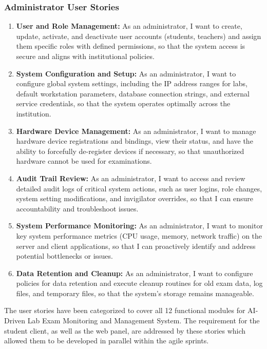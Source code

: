 \subsubsection{Administrator User Stories}
\begin{enumerate}
    \item \textbf{User and Role Management:} As an administrator, I want to create, update, activate, and deactivate user accounts (students, teachers) and assign them specific roles with defined permissions, so that the system access is secure and aligns with institutional policies.
    \item \textbf{System Configuration and Setup:} As an administrator, I want to configure global system settings, including the IP address ranges for labs, default workstation parameters, database connection strings, and external service credentials, so that the system operates optimally across the institution.
    \item \textbf{Hardware Device Management:} As an administrator, I want to manage hardware device registrations and bindings, view their status, and have the ability to forcefully de-register devices if necessary, so that unauthorized hardware cannot be used for examinations.
    \item \textbf{Audit Trail Review:} As an administrator, I want to access and review detailed audit logs of critical system actions, such as user logins, role changes, system setting modifications, and invigilator overrides, so that I can ensure accountability and troubleshoot issues.
    \item \textbf{System Performance Monitoring:} As an administrator, I want to monitor key system performance metrics (CPU usage, memory, network traffic) on the server and client applications, so that I can proactively identify and address potential bottlenecks or issues.
    \item \textbf{Data Retention and Cleanup:} As an administrator, I want to configure policies for data retention and execute cleanup routines for old exam data, log files, and temporary files, so that the system's storage remains manageable.
\end{enumerate}

The user stories have been categorized to cover all 12 functional modules for AI-Driven Lab Exam Monitoring and Management System. The requirement for the student client, as well as the web panel, are addressed by these stories which allowed them to be developed in parallel within the agile sprints.

